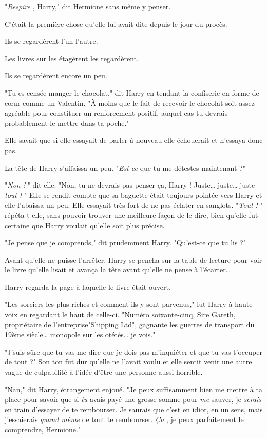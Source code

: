 "\emph{Respire} , Harry," dit Hermione sans même y penser.

C'était la première chose qu'elle lui avait dite depuis le jour du procès.

Ils se regardèrent l'un l'autre.

Les livres sur les étagèrent les regardèrent.

Ils se regardèrent encore un peu.

"Tu es censée manger le chocolat," dit Harry en tendant la confiserie en forme de cœur comme un Valentin. "À moins que le fait de recevoir le chocolat soit assez agréable pour constituer un renforcement positif, auquel cas tu devrais probablement le mettre dans ta poche."

Elle savait que si elle essayait de parler à nouveau elle échouerait et n'essaya donc pas.

La tête de Harry s'affaissa un peu. "\emph{Est-ce}  que tu me détestes maintenant ?"

"\emph{Non !} " dit-elle. "Non, tu ne devrais pas penser ça, Harry ! Juste… juste… juste \emph{tout !} " Elle se rendit compte que sa baguette était toujours pointée vers Harry et elle l'abaissa un peu. Elle essayait très fort de ne pas éclater en sanglots. "\emph{Tout !} " répéta-t-elle, sans pouvoir trouver une meilleure façon de le dire, bien qu'elle fut certaine que Harry voulait qu'elle soit plus précise.

"Je pense que je comprends," dit prudemment Harry. "Qu'est-ce que tu lis ?"

Avant qu'elle ne puisse l'arrêter, Harry se pencha sur la table de lecture pour voir le livre qu'elle lisait et avança la tête avant qu'elle ne pense à l'écarter…

Harry regarda la page à laquelle le livre était ouvert.

"Les sorciers les plus riches et comment ils y sont parvenus," lut Harry à haute voix en regardant le haut de celle-ci. "Numéro soixante-cinq, Sire Gareth, propriétaire de l'entreprise"Shipping Ltd", gagnante les guerres de transport du 19ème siècle… monopole sur les otétés… je vois."

"J'suis sûre que tu vas me dire que je dois pas m'inquiéter et que tu vas t'occuper de tout ?" Son ton fut dur qu'elle ne l'avait voulu et elle sentit venir une autre vague de culpabilité à l'idée d'être une personne aussi horrible.

"Nan," dit Harry, étrangement enjoué. "Je peux suffisamment bien me mettre à ta place pour savoir que si \emph{tu}  avais payé une grosse somme pour \emph{me}  sauver, je \emph{serais}  en train d'essayer de te rembourser. Je saurais que c'est en idiot, en un sens, mais j'essaierais \emph{quand même}  de tout te rembourser. \emph{Ça} , je peux parfaitement le comprendre, Hermione."

